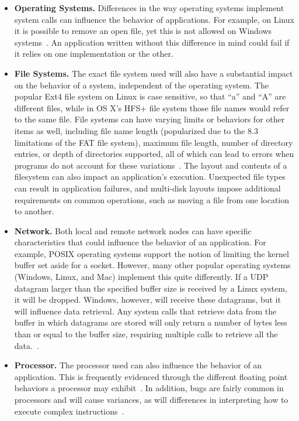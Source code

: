 \begin{itemize}

\item {\bf Operating Systems.} Differences in the way operating systems
implement system calls can influence the behavior of applications.  For
example, on Linux it is possible to remove an open file, yet this is not
allowed on Windows systems~\cite{UnlinkStandard}.  An application
written without this difference in mind could fail if it relies on one
implementation or the other.

\item {\bf File Systems.}  The exact file system used will also have a
substantial impact on the behavior of a system, independent of the
operating system.  The popular Ext4 file system on Linux is case sensitive,
so that ``a'' and ``A'' are different files,
while in OS X's HFS+ file system
those file names would refer to the same file.
File systems can have varying limits or behaviors for other items as well,
including file name length (popularized due to the 8.3 limitations of the
FAT file system), maximum file length, number of directory entries, or
depth
of directories supported, all of which can lead to errors when programs
do not account for these variations~\cite{EXT4Layout, AppleHFS}.
The layout and contents of a filesystem can also impact an application's
execution.  Unexpected file types can result in application
failures, and multi-disk layouts impose additional requirements on
common operations, such as moving a file from one location to
another.


\item {\bf Network.} Both local and remote network nodes
can have specific characteristics that could influence the behavior of an
application.
For example, POSIX operating
systems support the notion of limiting the kernel buffer set aside for a
socket.  However, many other popular operating
systems (Windows, Linux, and Mac)
implement this quite differently.
If a UDP datagram
larger than the specified buffer size is received by a Linux system,
it will be dropped.
Windows,
however,
will receive these datagrams,
but it will influence data retrieval.
Any system calls that retrieve data from the buffer in which
datagrams are
stored will only return a number of bytes less than or equal to the
buffer size, requiring multiple calls
to retrieve all the data.~\cite{Zhuang_NSDI_2014}.

\item {\bf Processor.}  The processor used can also influence the
behavior of an application.  This is frequently
evidenced through the different floating point behaviors a
processor may exhibit~\cite{ArbitraryPrecision}.
In addition, bugs are fairly common
in processors and will cause variances, as will
differences in interpreting
how to execute complex instructions~\cite{Microarch}.

\end{itemize}